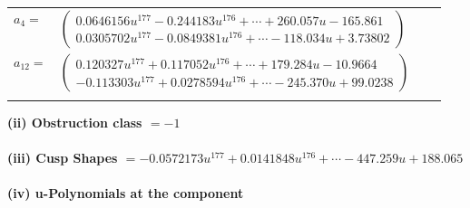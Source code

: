 \documentclass[1p]{elsarticle_modified}
\theoremstyle{definition}
\begin{document}
\begin{tabular}{m{7pt} m{180pt} m{7pt} m{180pt} }
\flushright $a_{4}=$&$\begin{pmatrix}0.0646156 u^{177}-0.244183 u^{176}+\cdots+260.057 u-165.861\\0.0305702 u^{177}-0.0849381 u^{176}+\cdots-118.034 u+3.73802\end{pmatrix}$ \\
\flushright $a_{12}=$&$\begin{pmatrix}0.120327 u^{177}+0.117052 u^{176}+\cdots+179.284 u-10.9664\\-0.113303 u^{177}+0.0278594 u^{176}+\cdots-245.370 u+99.0238\end{pmatrix}$\\&\end{tabular}
\flushleft \textbf{(ii) Obstruction class $= -1$}\\~\\
\flushleft \textbf{(iii) Cusp Shapes $= -0.0572173 u^{177}+0.0141848 u^{176}+\cdots-447.259 u+188.065$}\\~\\
\newpage\renewcommand{\arraystretch}{1}
\flushleft \textbf{(iv) u-Polynomials at the component}\newline \\
\end{document}
